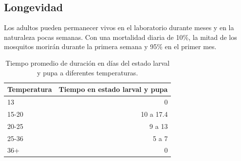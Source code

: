 \subsection{Longevidad}
Los adultos pueden permanecer vivos en el laboratorio durante meses y en la naturaleza pocas semanas. Con una mortalidad diaria de 10\%, la mitad de los mosquitos morirán durante la primera semana y 95\% en el primer mes.\\


\begin{table}
\centering
\begin{tabular}{l|r}
Temperatura & Tiempo en estado larval y pupa \\\hline
13 & 0 \\
15-20 & 10 a 17.4 \\
20-25 & 9 a 13 \\
25-36 & 5 a 7 \\
36+ & 0
\end{tabular}
\caption{\label{tab:widgets}Tiempo promedio de duración en días del estado larval y pupa a diferentes temperaturas.}
\end{table}
